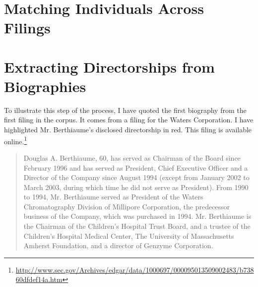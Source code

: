 \documentclass{article}
\newcommand{\1}{\mathds{1}}
\newcommand{\red}[1]{{\color{red}#1}}
\begin{document}
\section{Matching Individuals Across Filings\label{sec:matchit}}

\section{Extracting Directorships from Biographies}

To illustrate this step of the process, I have quoted the first
biography from the first filing in the corpus. It comes from a filing
for the Waters Corporation. I have highlighted Mr. Berthiaume's
disclosed directorship in red. This filing is available
online.\footnote{\url{http://www.sec.gov/Archives/edgar/data/1000697/000095013509002483/b73860dfdef14a.htm}}

\begin{quote}
Douglas A. Berthiaume, 60, has served as Chairman of the Board since
February 1996 and has served as President, Chief Executive Officer and
a Director of the Company since August 1994 (except from January 2002
to March 2003, during which time he did not serve as President). From
1990 to 1994, Mr. Berthiaume served as President of the Waters
Chromatography Division of Millipore Corporation, the predecessor
business of the Company, which was purchased in 1994. Mr. Berthiaume
is the Chairman of the Children's Hospital Trust Board, and a
trustee of the Children's Hospital Medical Center, The
University of Massachusetts Amherst Foundation, and a
director of \red{Genzyme Corporation}.
\end{quote}
\end{document}
